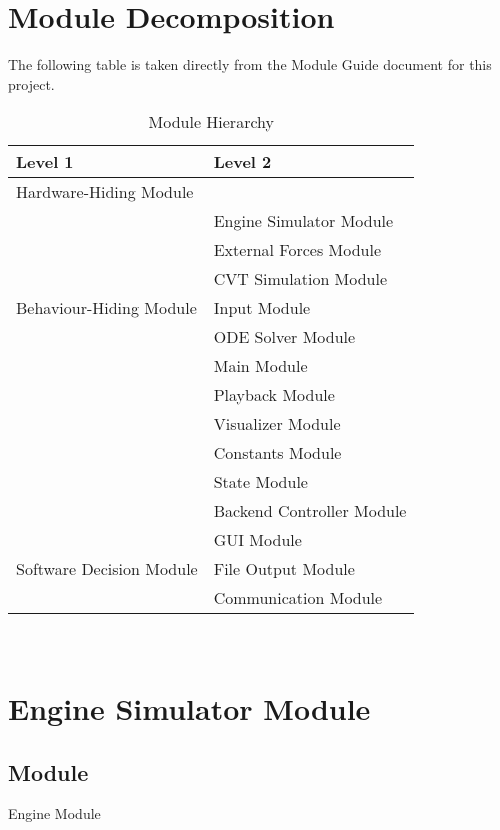 \documentclass[12pt, titlepage]{article}
\begin{document}
\section{Module Decomposition}

The following table is taken directly from the Module Guide document for this project.

\begin{table}[h!]
\centering
\begin{tabular}{p{} p{}}
\toprule
\textbf{Level 1} & \textbf{Level 2}\\
\midrule

{Hardware-Hiding Module} & ~ \\
\midrule

\multirow{7}{0.3\textwidth}{Behaviour-Hiding Module}
& Engine Simulator Module\\
& External Forces Module\\
& CVT Simulation Module\\
& Input Module\\
& ODE Solver Module\\
& Main Module\\ 
& Playback Module\\
& Visualizer Module\\
& Constants Module\\
& State Module\\
& Backend Controller Module\\
\midrule

\multirow{3}{0.3\textwidth}{Software Decision Module}
& GUI Module\\
& File Output Module\\
& Communication Module\\
\bottomrule

\end{tabular}
\caption{Module Hierarchy}
\label{TblMH}
\end{table}

\newpage
~\newpage

\section{Engine Simulator Module} \label{Module_engine_simulator}

\subsection{Module}

Engine Module
\end{document}

